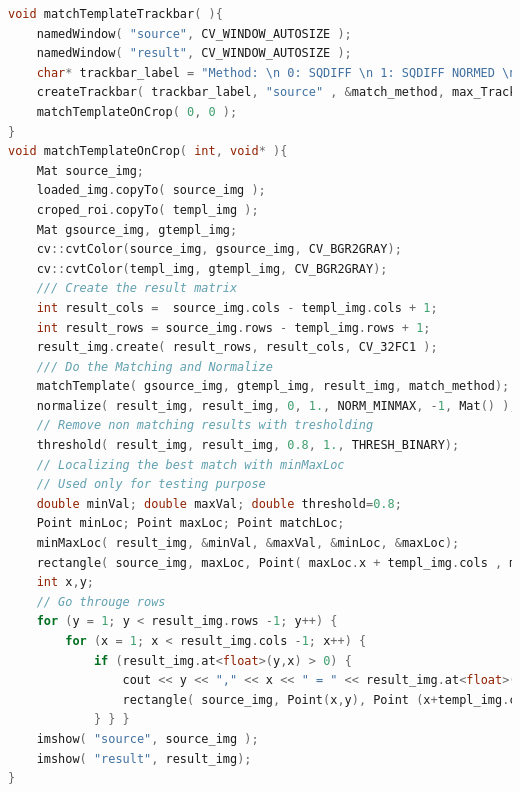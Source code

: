 \begin{lstlisting}[language=C,caption={Podudaranje susjedstva piksela s
    modelom}]
void matchTemplateTrackbar( ){
    namedWindow( "source", CV_WINDOW_AUTOSIZE );
    namedWindow( "result", CV_WINDOW_AUTOSIZE );
    char* trackbar_label = "Method: \n 0: SQDIFF \n 1: SQDIFF NORMED \n 2: TM CCORR \n 3: TM CCORR NORMED \n 4: TM COEFF \n 5: TM COEFF NORMED";
    createTrackbar( trackbar_label, "source" , &match_method, max_Trackbar, matchTemplateOnCrop );
    matchTemplateOnCrop( 0, 0 );
}
void matchTemplateOnCrop( int, void* ){
    Mat source_img;
    loaded_img.copyTo( source_img );
    croped_roi.copyTo( templ_img );
    Mat gsource_img, gtempl_img;
    cv::cvtColor(source_img, gsource_img, CV_BGR2GRAY);
    cv::cvtColor(templ_img, gtempl_img, CV_BGR2GRAY);
    /// Create the result matrix
    int result_cols =  source_img.cols - templ_img.cols + 1;
    int result_rows = source_img.rows - templ_img.rows + 1;   
    result_img.create( result_rows, result_cols, CV_32FC1 );
    /// Do the Matching and Normalize
    matchTemplate( gsource_img, gtempl_img, result_img, match_method);
    normalize( result_img, result_img, 0, 1., NORM_MINMAX, -1, Mat() );
    // Remove non matching results with tresholding
    threshold( result_img, result_img, 0.8, 1., THRESH_BINARY);
    // Localizing the best match with minMaxLoc
    // Used only for testing purpose
    double minVal; double maxVal; double threshold=0.8;
    Point minLoc; Point maxLoc; Point matchLoc;
    minMaxLoc( result_img, &minVal, &maxVal, &minLoc, &maxLoc);
    rectangle( source_img, maxLoc, Point( maxLoc.x + templ_img.cols , maxLoc.y + templ_img.rows ), Scalar(0,0,255) ); 
    int x,y;
    // Go througe rows
    for (y = 1; y < result_img.rows -1; y++) {
        for (x = 1; x < result_img.cols -1; x++) {
            if (result_img.at<float>(y,x) > 0) {
                cout << y << "," << x << " = " << result_img.at<float>(y,x) << endl; 
                rectangle( source_img, Point(x,y), Point (x+templ_img.cols, y+templ_img.rows), Scalar(0,255,0));  
            } } }
    imshow( "source", source_img );
    imshow( "result", result_img);
}
\end{lstlisting}

